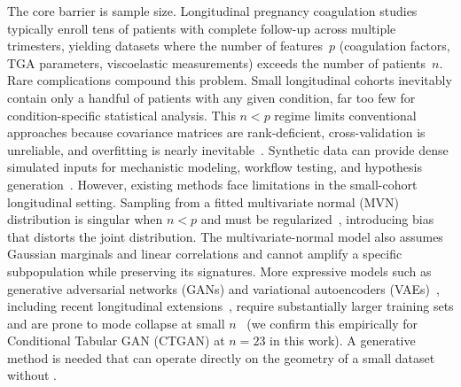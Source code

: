 The core barrier is sample size. Longitudinal pregnancy coagulation studies
typically enroll tens of patients with complete follow-up across multiple trimesters,
yielding datasets where the number of features~$p$ (coagulation factors, TGA
parameters, viscoelastic measurements) exceeds the number of patients~$n$. Rare
complications compound this problem. Small longitudinal cohorts inevitably contain
only a handful of patients with any given condition, far too few for
condition-specific statistical analysis. This $n < p$ regime limits conventional
approaches because covariance matrices are rank-deficient, cross-validation is
unreliable, and overfitting is nearly inevitable~\citep{Hastie2009}. Synthetic data can
provide dense simulated inputs for mechanistic modeling, workflow testing, and hypothesis
generation~\citep{Gonzales2023,Kuhnel2024}.  However, existing methods face
limitations in the small-cohort longitudinal setting. Sampling from a fitted
multivariate normal (MVN) distribution is singular when $n < p$ and must be
regularized~\citep{Ledoit2004}, introducing bias that distorts the joint distribution.
The multivariate-normal model also assumes Gaussian marginals and linear correlations and
cannot amplify a specific subpopulation while preserving
its signatures. More expressive models such as generative adversarial networks (GANs) and
variational autoencoders (VAEs)~\citep{Goodfellow2014,Kingma2014,Xu2019CTGAN}, including recent longitudinal
extensions~\citep{Kuhnel2024}, require substantially larger training sets and are
prone to mode collapse at small $n$~\citep{DeMitri2025} (we confirm this empirically for Conditional Tabular GAN (CTGAN) at
$n{=}23$ in this work). A generative method is needed that can operate
directly on the geometry of a small dataset without .

